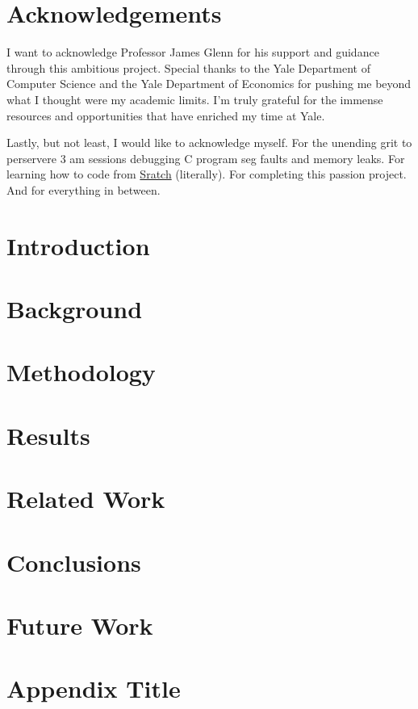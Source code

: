 \documentclass[12pt,twoside]{report}
\begin{document}


\chapter*{Acknowledgements}
I want to acknowledge Professor James Glenn for his support and guidance through this ambitious project. Special thanks to the Yale Department of Computer Science and the Yale Department of Economics for pushing me beyond what I thought were my academic limits.
I'm truly grateful for the immense resources and opportunities that have enriched my time at Yale.

Lastly, but not least, I would like to acknowledge myself. For the unending grit to perservere 3 am sessions debugging C program seg faults and memory leaks. For learning how to code from \href{https://scratch.mit.edu/}{Sratch} (literally). For completing this passion project.
And for everything in between.
{
  \hypersetup{linkcolor=black}
  \tableofcontents
}

\clearpage




\chapter{Introduction}


\chapter{Background} \label{ch:background}


\chapter{Methodology} \label{ch:methodology}



\chapter{Results} \label{ch:results}


\chapter{Related Work} \label{ch:relatedwork}


\chapter{Conclusions} \label{ch:conclusion}


\chapter{Future Work} \label{ch:futurework}



\printbibliography

\appendix
\chapter{Appendix Title} \label{ch:appendices}
 
\end{document}
